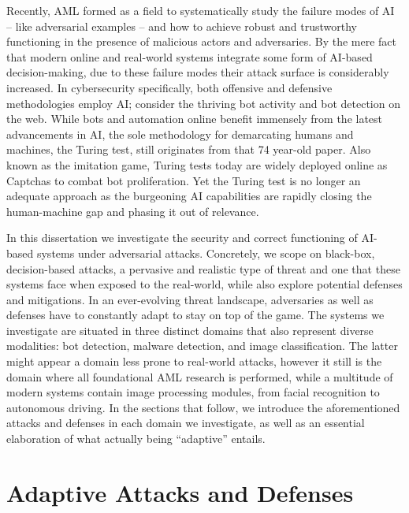 Recently, \gls{AML} formed as a field to systematically study the failure modes of AI -- like adversarial examples -- and how to achieve robust and trustworthy functioning in the presence of malicious actors and adversaries.
By the mere fact that modern online and real-world systems integrate some form of AI-based decision-making, due to these failure modes their attack surface is considerably increased.
In cybersecurity specifically, both offensive and defensive methodologies employ AI; consider the thriving bot activity and bot detection on the web.
While bots and automation online benefit immensely from the latest advancements in AI, the sole methodology for demarcating humans and machines, the Turing test, still originates from that 74 year-old paper.
Also known as the imitation game, Turing tests today are widely deployed online as Captchas to combat bot proliferation.
Yet the Turing test is no longer an adequate approach as the burgeoning \gls{AI} capabilities are rapidly closing the human-machine gap and phasing it out of relevance.

In this dissertation we investigate the security and correct functioning of AI-based systems under adversarial attacks.
Concretely, we scope on black-box, decision-based attacks, a pervasive and realistic type of threat and one that these systems face when exposed to the real-world, while also explore potential defenses and mitigations.
In an ever-evolving threat landscape, adversaries as well as defenses have to constantly adapt to stay on top of the game.
The systems we investigate are situated in three distinct domains that also represent diverse modalities: bot detection, malware detection, and image classification.
The latter might appear a domain less prone to real-world attacks, however it still is the domain where all foundational \gls{AML} research is performed, while a multitude of modern systems contain image processing modules, from facial recognition to autonomous driving.
In the sections that follow, we introduce the aforementioned attacks and defenses in each domain we investigate, as well as an essential elaboration of what actually being ``adaptive'' entails.

\section{Adaptive Attacks and Defenses}

